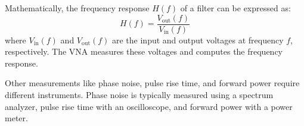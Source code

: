 Mathematically, the frequency response \( H(f) \) of a filter can be expressed as:
\[
H(f) = \frac{V_{\text{out}}(f)}{V_{\text{in}}(f)}
\]
where \( V_{\text{in}}(f) \) and \( V_{\text{out}}(f) \) are the input and output voltages at frequency \( f \), respectively. The VNA measures these voltages and computes the frequency response.

Other measurements like phase noise, pulse rise time, and forward power require different instruments. Phase noise is typically measured using a spectrum analyzer, pulse rise time with an oscilloscope, and forward power with a power meter.

